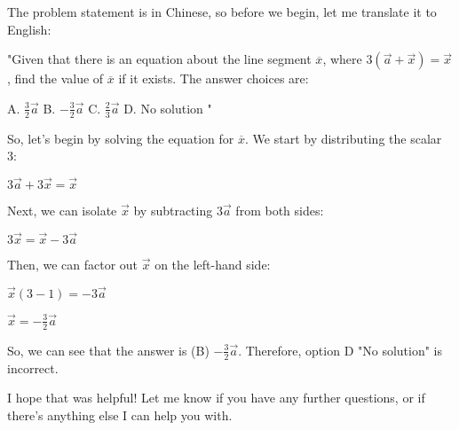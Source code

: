 \documentclass{article}
\begin{document}
The problem statement is in Chinese, so before we begin, let me translate it to English:

"Given that there is an equation about the line segment $\overline{x}$, where $3(\overrightarrow{a} + \overrightarrow{x}) = \overrightarrow{x}$, find the value of $\overline{x}$ if it exists. The answer choices are:

A. $\frac{3}{2}\overrightarrow{a}$
B. $-\frac{3}{2}\overrightarrow{a}$
C. $\frac{2}{3}\overrightarrow{a}$
D. No solution "

So, let's begin by solving the equation for $\overline{x}$. We start by distributing the scalar 3:

$3\overrightarrow{a} + 3\overrightarrow{x} = \overrightarrow{x}$

Next, we can isolate $\overrightarrow{x}$ by subtracting $3\overrightarrow{a}$ from both sides:

$3\overrightarrow{x} = \overrightarrow{x} - 3\overrightarrow{a}$

Then, we can factor out $\overrightarrow{x}$ on the left-hand side:

$\overrightarrow{x}(3 - 1) = -3\overrightarrow{a}$

$\overrightarrow{x} = -\frac{3}{2}\overrightarrow{a}$

So, we can see that the answer is (B) $-\frac{3}{2}\overrightarrow{a}$. Therefore, option D "No solution" is incorrect.

I hope that was helpful! Let me know if you have any further questions, or if there's anything else I can help you with.
\end{document}
